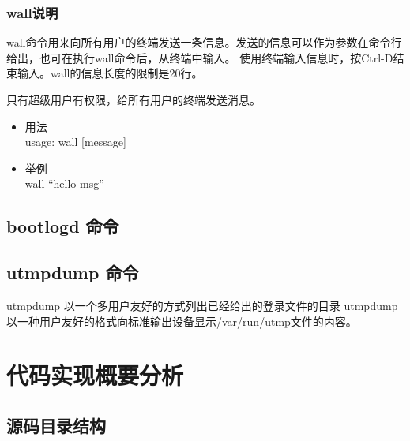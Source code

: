 \subsubsection{wall说明}

wall命令用来向所有用户的终端发送一条信息。发送的信息可以作为参数在命令行给出，也可在执行wall命令后，从终端中输入。
使用终端输入信息时，按Ctrl-D结束输入。wall的信息长度的限制是20行。

只有超级用户有权限，给所有用户的终端发送消息。

\begin{itemize}
\item
  用法\\ usage: wall {[}message{]}
\item
  举例\\ wall ``hello msg''
\end{itemize}
\subsection{bootlogd 命令}

\subsection{utmpdump 命令}

utmpdump 以一个多用户友好的方式列出已经给出的登录文件的目录 utmpdump
以一种用户友好的格式向标准输出设备显示/var/run/utmp文件的内容。

\section{代码实现概要分析}

\subsection{源码目录结构}

